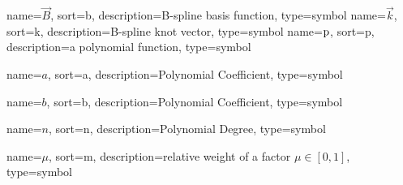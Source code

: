 	{%
		name=\ensuremath{\vec{B}},
		sort=b,
		description=B-spline basis function,
		type=symbol
	}
	\newcommand{\bspline}{\gls{sym:bspline}}
	{%
		name=\ensuremath{\vec{k}},
		sort=k,
		description=B-spline knot vector,
		type=symbol
	}
	\newcommand{\knot}{\gls{sym:knot}}
	{%
		name=\ensuremath{\func{p}},
		sort=p,
		description=a polynomial function,
		type=symbol
	}
	\newcommand{\polynomial}{\gls{sym:polynomial}}

	{%
		name=\ensuremath{a},
		sort=a,
		description=Polynomial Coefficient,
		type=symbol
	}
	\newcommand{\coefficient}{\gls{sym:coefficient}}

	{%
		name=\ensuremath{b},
		sort=b,
		description=Polynomial Coefficient,
		type=symbol
	}
	\newcommand{\coefficientb}{\gls{sym:coefficientb}}

	{%
		name=\ensuremath{n},
		sort=n,
		description=Polynomial Degree,
		type=symbol
	}
	\newcommand{\poldeg}{\gls{sym:poldeg}}

	{%
		name=\ensuremath{\mu},
		sort=m,
		description=relative weight of a factor \ensuremath{\mu \in [0, 1]},
		type=symbol
	}
	\newcommand{\relweight}{\gls{sym:relweight}}

